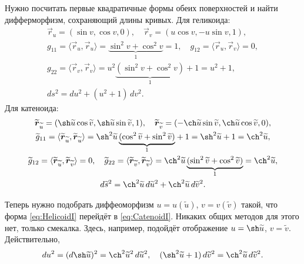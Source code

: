 \begin{solution}
	Нужно посчитать первые квадратичные формы обеих поверхностей и найти дифферморфизм, сохраняющий длины кривых. Для геликоида:
	\begin{gather} \label{eq:HelicoidI}
		\vec{r}_u = (\sin v, \cos v, 0),\quad \vec{r}_v = (u\cos v, -u\sin v, 1),\nonumber\\
		g_{11} = \langle\vec{r}_u, \vec{r}_u\rangle = {\underbrace{\sin^2v + \cos^2v}_{1}} = 1,\quad g_{12} = \langle\vec{r}_u, \vec{r}_v\rangle = 0,\nonumber\\
		g_{22} = \langle\vec{r}_v, \vec{r}_v\rangle = u^2{\underbrace{(\sin^2v + \cos^2v)}_{1}} + 1 = u^2 + 1,\nonumber\\
		ds^2 = du^2 + (u^2 + 1)\,dv^2.
	\end{gather}
	Для катеноида:
	\begin{gather}
		\widetilde{\vec{r}}_{\widetilde{u}} = (\sh \widetilde{u}\cos \widetilde{v}, \sh \widetilde{u}\sin \widetilde{v}, 1),\quad \widetilde{\vec{r}}_{\widetilde{v}} = (-\ch \widetilde{u}\sin \widetilde{v}, \ch \widetilde{u}\cos \widetilde{v}, 0),\nonumber\\
		\widetilde{g}_{11} = \langle\widetilde{\vec{r}}_{\widetilde{u}}, \widetilde{\vec{r}}_{\widetilde{u}}\rangle = \sh^2\widetilde{u}\,{\underbrace{(\cos^2\widetilde{v} + \sin^2\widetilde{v})}_{1}} + 1 = \sh^2\widetilde{u} + 1 = \ch^2\widetilde{u},\nonumber\\
		\widetilde{g}_{12} = \langle\widetilde{\vec{r}}_{\widetilde{u}}, \widetilde{\vec{r}}_{\widetilde{v}}\rangle = 0,\quad
		\widetilde{g}_{22} = \langle\widetilde{\vec{r}}_{\widetilde{v}}, \widetilde{\vec{r}}_{\widetilde{v}}\rangle = \ch^2\widetilde{u}\,{\underbrace{(\sin^2\widetilde{v} + \cos^2\widetilde{v})}_{1}} = \ch^2\widetilde{u},\nonumber\\
		d\widetilde{s}^2 = \ch^2\widetilde{u}\,d\widetilde{u}^2 + \ch^2\widetilde{u}\,d\widetilde{v}^2. \label{eq:CatenoidI}
	\end{gather}

	Теперь нужно подобрать диффеоморфизм $u = u(\widetilde{u})$, $v = v(\widetilde{v})$ такой, что форма \eqref{eq:HelicoidI} перейдёт в \eqref{eq:CatenoidI}. Никаких общих методов для этого нет, только смекалка. Здесь, например, подойдёт отображение $u = \sh\widetilde{u}$, $v = \widetilde{v}$. Действительно,
	\[
		du^2 = (d\sh\widetilde{u})^2 = \ch^2\widetilde{u}^2\,d\widetilde{u}^2,\quad(\sh^2\widetilde{u} + 1)\,d\widetilde{v}^2 = \ch^2\widetilde{u}\,d\widetilde{v}^2.
	\]
\end{solution}

